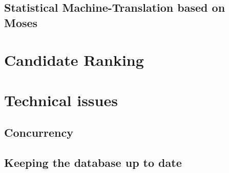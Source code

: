 \subsection{Statistical Machine-Translation based on Moses}


\newpage

\section{Candidate Ranking}




\section{Technical issues}

\subsection{Concurrency}




\subsection{Keeping the database up to date}




